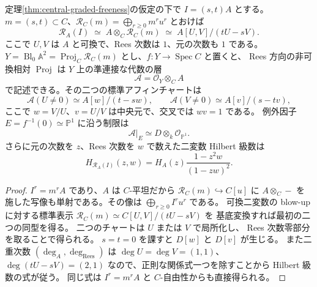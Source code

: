 \begin{theorem}
\label{thm:central-rees-basechange}
定理\ref{thm:central-graded-freeness}の仮定の下で $I=(s,t)A$ とする。
$m=(s,t)\subset C$、$\mathcal R_C(m)=\bigoplus_{r\ge0}m^r u^r$ とおけば
\[
\boxed{\quad
 \mathcal R_A(I)\;\simeq\; A\otimes_C\mathcal R_C(m)
 \;\simeq\; A[U,V]/(tU-sV).
 \quad}
\]
ここで $U,V$ は $A$ と可換で、Rees 次数は $1$、元の次数も $1$ である。
$Y=\operatorname{Bl}_0\mathbb A^2=\operatorname{Proj}_{C}\mathcal R_C(m)$
とし、$f:Y\to\operatorname{Spec}C$ と置くと、
Rees 方向の非可換相対 $\operatorname{Proj}$ は
$Y$ 上の準連接な代数の層
\[
  \mathscr A=\mathcal O_Y\otimes_C A
\]
で記述できる。その二つの標準アフィンチャートは
\[
\mathscr A(U\ne0)\simeq A[w]/(t-sw),\qquad
\mathscr A(V\ne0)\simeq A[v]/(s-tv),
\]
ここで $w=V/U$、$v=U/V$ は中央元で、交叉では $wv=1$ である。
例外因子 $E=f^{-1}(0)\simeq\mathbb P^1$ に沿う制限は
\[
  \mathscr A|_E\simeq D\otimes_k\mathcal O_{\mathbb P^1}.
\]
さらに元の次数を $z$、Rees 次数を $w$ で数えた二変数 Hilbert 級数は
\[
 H_{\mathcal R_A(I)}(z,w)
   =H_A(z)\frac{1-z^2w}{(1-zw)^2}.
\]
\end{theorem}
\begin{proof}
$I^r=m^rA$ であり、$A$ は $C$-平坦だから
$\mathcal R_C(m)\hookrightarrow C[u]$ に
$A\otimes_C-$ を施した写像も単射である。その像は
$\bigoplus_{r\ge0}I^ru^r$ である。
可換二変数の blow-up に対する標準表示
$\mathcal R_C(m)\simeq C[U,V]/(tU-sV)$ を
基底変換すれば最初の二つの同型を得る。
二つのチャートは $U$ または $V$ で局所化し、
Rees 次数零部分を取ることで得られる。
$s=t=0$ を課すと $D[w]$ と $D[v]$ が生じる。
また二重次数 $(\deg_A,\deg_{\mathrm{Rees}})$ は
$\deg U=\deg V=(1,1)$、$\deg(tU-sV)=(2,1)$
なので、正則な関係式一つを除すことから Hilbert 級数の式が従う。
同じ式は $I^r=m^rA$ と $C$-自由性からも直接得られる。
\end{proof}

